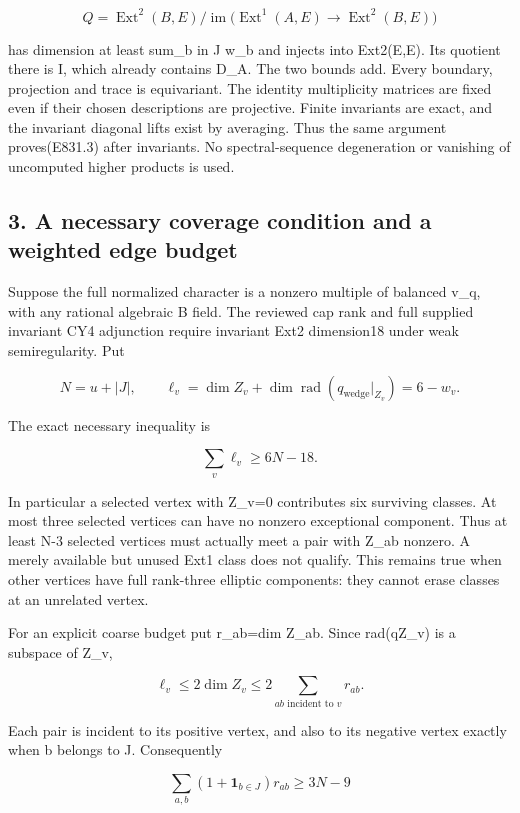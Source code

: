 \[
 Q=\operatorname{Ext}^2(B,E)\big/
 \operatorname{im}\bigl(\operatorname{Ext}^1(A,E)
                   \to\operatorname{Ext}^2(B,E)\bigr)
 \tag{E831.6}
\]

has dimension at least sum\_b in J w\_b and injects into Ext2(E,E). Its
quotient there is I, which already contains D\_A. The two bounds add. Every
boundary, projection and trace is equivariant. The identity multiplicity
matrices are fixed even if their chosen descriptions are projective. Finite
invariants are exact, and the invariant diagonal lifts exist by averaging.
Thus the same argument proves(E831.3) after invariants. No spectral-sequence
degeneration or vanishing of uncomputed higher products is used.

\subsection{3. A necessary coverage condition and a weighted edge
budget}\label{SF-E831:a-necessary-coverage-condition-and-a-weighted-edge-budget}

Suppose the full normalized character is a nonzero multiple of balanced
v\_q, with any rational algebraic B field. The reviewed cap rank and full
supplied invariant CY4 adjunction require invariant Ext2 dimension18 under
weak semiregularity. Put

\[
 N=u+|J|,\qquad
 \ell_v=\dim Z_v+
       \dim\operatorname{rad}(q_{\mathrm{wedge}}|_{Z_v})=6-w_v.
 \tag{E831.7}
\]

The exact necessary inequality is

\[
 \sum_v\ell_v\ge6N-18.
 \tag{E831.8}
\]

In particular a selected vertex with Z\_v=0 contributes six surviving
classes. At most three selected vertices can have no nonzero exceptional
component. Thus at least N-3 selected vertices must actually meet a pair
with Z\_ab nonzero. A merely available but unused Ext1 class does not
qualify. This remains true when other vertices have full rank-three elliptic
components: they cannot erase classes at an unrelated vertex.

For an explicit coarse budget put r\_ab=dim Z\_ab. Since rad(q\textbar Z\_v)
is a subspace of Z\_v,

\[
 \ell_v\le2\dim Z_v\le2\sum_{ab\text{ incident to }v}r_{ab}.
 \tag{E831.9}
\]

Each pair is incident to its positive vertex, and also to its negative
vertex exactly when b belongs to J. Consequently

\[
 \sum_{a,b}(1+\mathbf1_{b\in J})r_{ab}\ge3N-9
 \tag{E831.10}
\]

